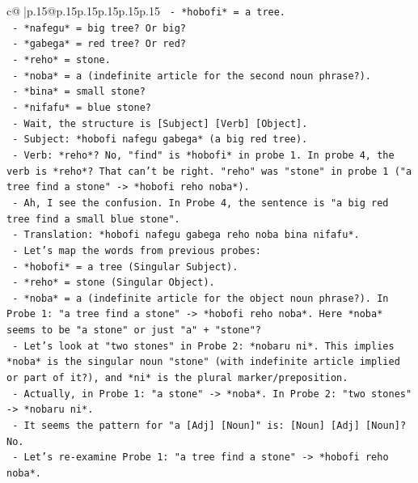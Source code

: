 \documentclass{article}
\begin{document}
{\begin{supertabular}{c@{$\;$}|p{.15\linewidth}@{}p{.15\linewidth}p{.15\linewidth}p{.15\linewidth}p{.15\linewidth}p{.15\linewidth}}
{{{\texttt{      {-} *hobofi* = a tree.} \\
\texttt{      {-} *nafegu* = big tree? Or big?} \\
\texttt{      {-} *gabega* = red tree? Or red?} \\
\texttt{      {-} *reho* = stone.} \\
\texttt{      {-} *noba* = a (indefinite article for the second noun phrase?).} \\
\texttt{      {-} *bina* = small stone?} \\
\texttt{      {-} *nifafu* = blue stone?} \\
\texttt{    {-} Wait, the structure is {[}Subject{]} {[}Verb{]} {[}Object{]}.} \\
\texttt{    {-} Subject: *hobofi nafegu gabega* (a big red tree).} \\
\texttt{    {-} Verb: *reho*? No, "find" is *hobofi* in probe 1. In probe 4, the verb is *reho*? That can't be right. "reho" was "stone" in probe 1 ("a tree find a stone" {-}> *hobofi reho noba*).} \\
\texttt{    {-} Ah, I see the confusion. In Probe 4, the sentence is "a big red tree find a small blue stone".} \\
\texttt{    {-} Translation: *hobofi nafegu gabega reho noba bina nifafu*.} \\
\texttt{    {-} Let's map the words from previous probes:} \\
\texttt{      {-} *hobofi* = a tree (Singular Subject).} \\
\texttt{      {-} *reho* = stone (Singular Object).} \\
\texttt{      {-} *noba* = a (indefinite article for the object noun phrase?). In Probe 1: "a tree find a stone" {-}> *hobofi reho noba*. Here *noba* seems to be "a stone" or just "a" + "stone"?} \\
\texttt{      {-} Let's look at "two stones" in Probe 2: *nobaru ni*. This implies *noba* is the singular noun "stone" (with indefinite article implied or part of it?), and *ni* is the plural marker/preposition.} \\
\texttt{      {-} Actually, in Probe 1: "a stone" {-}> *noba*. In Probe 2: "two stones" {-}> *nobaru ni*.} \\
\texttt{      {-} It seems the pattern for "a {[}Adj{]} {[}Noun{]}" is: {[}Noun{]} {[}Adj{]} {[}Noun{]}? No.} \\
\texttt{      {-} Let's re{-}examine Probe 1: "a tree find a stone" {-}> *hobofi reho noba*.} \\
}}}
\end{supertabular}}
\end{document}
